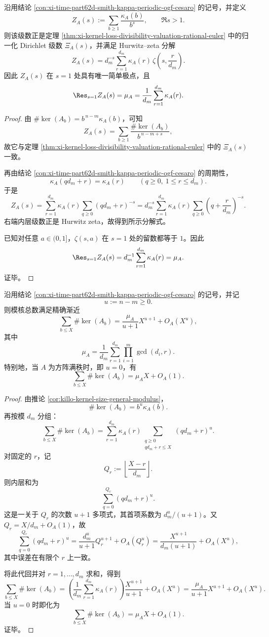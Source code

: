 \begin{conclusion}\label{con:xi-time-part62d-smith-kappa-hurwitz-residue}
沿用结论 \ref{con:xi-time-part62d-smith-kappa-periodic-ogf-cesaro} 的记号，并定义
\[
Z_A(s):=\sum_{b\ge 1}\frac{\kappa_A(b)}{b^s},
\qquad
\Re s>1.
\]
则该级数正是定理 \ref{thm:xi-kernel-loss-divisibility-valuation-rational-euler} 中的归一化 Dirichlet 级数 \(\Xi_A(s)\)，并满足 Hurwitz--zeta 分解
\[
Z_A(s)
=
d_m^{-s}\sum_{r=1}^{d_m}\kappa_A(r)\,
\zeta\!\left(s,\frac{r}{d_m}\right).
\]
因此 \(Z_A(s)\) 在 \(s=1\) 处具有唯一简单极点，且
\[
\Res_{s=1}Z_A(s)
=
\mu_A
=
\frac{1}{d_m}\sum_{r=1}^{d_m}\kappa_A(r).
\]
\end{conclusion}
\begin{proof}
由 \(\#\ker(A_b)=b^{\,n-m}\kappa_A(b)\)，可知
\[
Z_A(s)=\sum_{b\ge 1}\frac{\#\ker(A_b)}{b^{\,n-m+s}},
\]
故它与定理 \ref{thm:xi-kernel-loss-divisibility-valuation-rational-euler} 中的 \(\Xi_A(s)\) 一致。

再由结论 \ref{con:xi-time-part62d-smith-kappa-periodic-ogf-cesaro} 的周期性，
\[
\kappa_A(qd_m+r)=\kappa_A(r)\qquad(q\ge 0,\ 1\le r\le d_m).
\]
于是
\[
Z_A(s)
=
\sum_{r=1}^{d_m}\kappa_A(r)\sum_{q\ge 0}(qd_m+r)^{-s}
=
d_m^{-s}\sum_{r=1}^{d_m}\kappa_A(r)\sum_{q\ge 0}\left(q+\frac{r}{d_m}\right)^{-s}.
\]
右端内层级数正是 Hurwitz zeta，故得到所示分解式。

已知对任意 \(a\in(0,1]\)，\(\zeta(s,a)\) 在 \(s=1\) 处的留数都等于 \(1\)。因此
\[
\Res_{s=1}Z_A(s)
=
d_m^{-1}\sum_{r=1}^{d_m}\kappa_A(r)
=
\mu_A.
\]
证毕。
\end{proof}

\begin{conclusion}\label{con:xi-time-part62d-smith-kernel-summatory-periodic-average}
沿用结论 \ref{con:xi-time-part62d-smith-kappa-periodic-ogf-cesaro} 的记号，并记
\[
u:=n-m\ge 0.
\]
则模核总数满足精确渐近
\[
\sum_{b\le X}\#\ker(A_b)
=
\frac{\mu_A}{u+1}X^{u+1}+O_A(X^u),
\]
其中
\[
\mu_A=\frac{1}{d_m}\sum_{r=1}^{d_m}\prod_{i=1}^{m}\gcd(d_i,r).
\]
特别地，当 \(A\) 为方阵满秩时，即 \(u=0\)，有
\[
\sum_{b\le X}\#\ker(A_b)=\mu_A X+O_A(1).
\]
\end{conclusion}
\begin{proof}
由推论 \ref{cor:killo-kernel-size-general-modulus}，
\[
\#\ker(A_b)=b^u\kappa_A(b).
\]
再按模 \(d_m\) 分组：
\[
\sum_{b\le X}\#\ker(A_b)
=
\sum_{r=1}^{d_m}\kappa_A(r)
\sum_{\substack{q\ge 0\\ qd_m+r\le X}}(qd_m+r)^u.
\]
对固定的 \(r\)，记
\[
Q_r:=\left\lfloor \frac{X-r}{d_m}\right\rfloor.
\]
则内层和为
\[
\sum_{q=0}^{Q_r}(qd_m+r)^u.
\]
这是一关于 \(Q_r\) 的次数 \(u+1\) 多项式，其首项系数为 \(d_m^u/(u+1)\)。又 \(Q_r=X/d_m+O_A(1)\)，故
\[
\sum_{q=0}^{Q_r}(qd_m+r)^u
=
\frac{d_m^u}{u+1}Q_r^{u+1}+O_A(Q_r^u)
=
\frac{X^{u+1}}{d_m(u+1)}+O_A(X^u),
\]
其中误差在有限个 \(r\) 上一致。

将此代回并对 \(r=1,\dots,d_m\) 求和，得到
\[
\sum_{b\le X}\#\ker(A_b)
=
\left(\frac{1}{d_m}\sum_{r=1}^{d_m}\kappa_A(r)\right)\frac{X^{u+1}}{u+1}
+O_A(X^u)
=
\frac{\mu_A}{u+1}X^{u+1}+O_A(X^u).
\]
当 \(u=0\) 时即化为
\[
\sum_{b\le X}\#\ker(A_b)=\mu_A X+O_A(1).
\]
证毕。
\end{proof}

